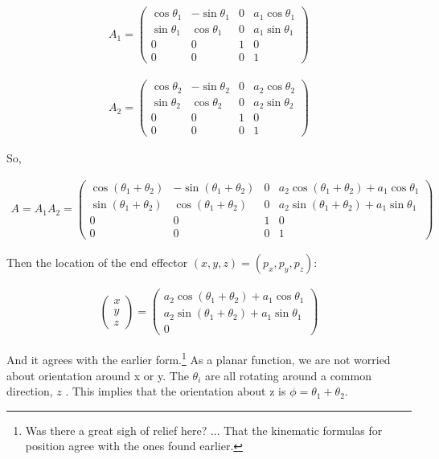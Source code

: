 \[\begin{aligned}
A_1 =\begin{pmatrix}\cos \theta_1 & -\sin \theta_1 & 0 & a_1 \cos \theta_1 \\
         \sin \theta_1 & \cos \theta_1 & 0 & a_1 \sin \theta_1
        \\ 0 &0 & 1 & 0 \\
         0& 0& 0& 1 \end{pmatrix}
\end{aligned}\]

\[\begin{aligned}
A_2 =\begin{pmatrix}\cos \theta_2 & -\sin \theta_2 & 0 & a_2 \cos \theta_2 \\
         \sin \theta_2 & \cos \theta_2 & 0 & a_2 \sin \theta_2 \\ 0 &0 & 1 & 0 \\
         0& 0& 0& 1 \end{pmatrix}
\end{aligned}\]

So,

\[\begin{aligned}
A = A_1A_2 =
  \begin{pmatrix}\cos (\theta_1+\theta_2) & -\sin (\theta_1+\theta_2) & 0 & a_2 \cos (\theta_1+\theta_2) + a_1 \cos \theta_1 \\
\sin (\theta_1 +\theta_2) & \cos (\theta_1 +\theta_2) & 0 & a_2 \sin (\theta_1 +\theta_2) + a_1\sin \theta_1\\
         0 &0 & 1 & 0 \\
         0& 0& 0& 1
  \end{pmatrix}
\end{aligned}\]

Then the location of the end effector \((x,y,z) = (p_x, p_y, p_z)\):

\[\begin{aligned}
\begin{pmatrix}
x \\ y \\ z
\end{pmatrix}
=
\begin{pmatrix}
a_2\cos (\theta_1+\theta_2) + a_1 \cos \theta_1 \\
a_2 \sin (\theta_1 +\theta_2) + a_1\sin \theta_1 \\
0
\end{pmatrix}
\end{aligned}\]

And it agrees with the earlier form.\footnote{Was there a great sigh of
  relief here? ... That the kinematic formulas for position agree with
  the ones found earlier.} As a planar function, we are not worried
about orientation around x or y. The \(\theta_i\) are all rotating
around a common direction, \(z\) . This implies that the orientation
about z is \(\phi = \theta_1 + \theta_2\).

